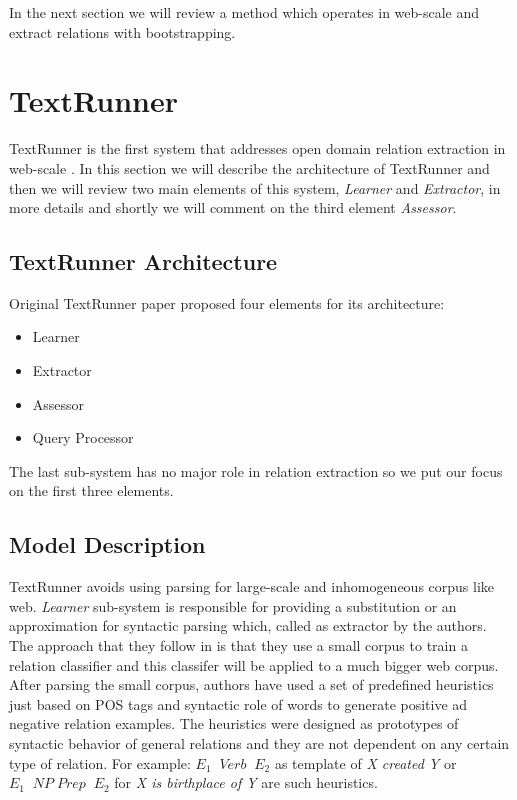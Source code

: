 \documentclass[12pt]{report}
\begin{document}
In the next section we will review a method which operates in web-scale and extract relations with bootstrapping.




\section{TextRunner}
\label{ch:unsupervised}

TextRunner is the first system that addresses open domain relation extraction in web-scale \cite{Yates2007}. In this section
 we will describe the architecture of TextRunner and then we will review two main elements of this system, \emph{Learner} and
  \emph{Extractor}, in more details and shortly we will comment on the third element \emph{Assessor}.
 
\subsection{TextRunner Architecture}
\label{ch:arch}

Original TextRunner paper proposed four elements for its architecture:
\begin{itemize}
  \item Learner
  \item Extractor
  \item Assessor
  \item Query Processor
\end{itemize}

The last sub-system has no major role in relation extraction so we put our focus on the first three elements.

\subsection{Model Description}
\label{ch:model}

TextRunner avoids using parsing for large-scale and inhomogeneous corpus like web. \emph{Learner} sub-system is responsible
 for providing a substitution or an approximation for syntactic parsing which, called as extractor by the authors.
  The approach that they follow in \cite{Yates2007}
  is that they use a small corpus to train a  relation classifier and this classifer will be applied to a much bigger web corpus.
   After parsing the small corpus, authors have used a set of predefined heuristics just based on POS tags and syntactic role 
   of words to generate positive ad negative relation examples. The heuristics were designed as prototypes of syntactic behavior
   of general relations and they are not dependent on any certain type of relation. 
   For example:   $E_1 \;\; Verb \;\; E_2$ as template of \emph{X created Y} or 
   $ E_1 \; \; NP \;  Prep \; \; E_2$ for \emph{X is birthplace of Y} are such heuristics.\\
   
\end{document}

